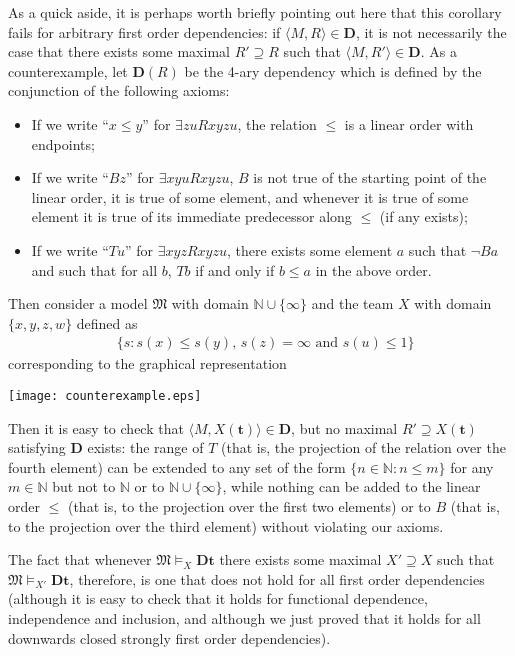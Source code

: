 \documentclass{article}
\theoremstyle{definition}
\newcommand{\tuple}{\mathbf}
\newcommand{\M}{\mathfrak M}
\newcommand{\D}{\mathbf D}
\begin{document}
As a quick aside, it is perhaps worth briefly pointing out here that this corollary fails for arbitrary first order dependencies: if $\langle M, R\rangle \in \D$, it is not necessarily the case that there exists some maximal $R' \supseteq R$ such that $\langle M, R'\rangle \in \D$. As a counterexample, let $\D(R)$ be the 4-ary dependency which is defined by the conjunction of the following axioms: 
\begin{itemize}
\item If we write ``$x \leq y$'' for $\exists z u R x y z u$, the relation $\leq$ is a linear order with endpoints; 
\item If we write ``$B z$'' for $\exists x y u R x y z u$, $B$ is not true of the starting point of the linear order, it is true of some element, and whenever it is true of some element it is true of its immediate predecessor along $\leq$ (if any exists); 
\item If we write ``$T u$'' for $\exists x y z R x y z u$, there exists some element $a$ such that $\lnot B a$ and such that for all $b$, $T b$ if and only if $b \leq a$ in the above order.
\end{itemize}
Then consider a model $\M$ with domain $\mathbb N \cup \{\infty\}$ and the team $X$  with domain $\{x,y,z,w\}$ defined as 
\begin{align*}
	&\{s :  s(x) \leq s(y) \text{, } s(z) = \infty \text{ and } s(u) \leq 1\}
\end{align*}
corresponding to the graphical representation
\begin{center}
\texttt{[image: counterexample.eps]}
\end{center}

Then it is easy to check that $\langle M, X(\tuple t)\rangle \in \D$, but no maximal $R' \supseteq X(\tuple t)$ satisfying $\D$ exists: the range of $T$ (that is, the projection of the relation over the fourth element) can be extended to any set of the form $\{n \in \mathbb N: n \leq m\}$ for any $m \in \mathbb N$ but not to $\mathbb N$ or to $\mathbb N \cup \{\infty\}$, while nothing can be added to the linear order $\leq$ (that is, to the projection over the first two elements) or to $B$ (that is, to the projection over the third element) without violating our axioms. 

The fact that whenever $\M \models_X \D \tuple t$ there exists some maximal $X' \supseteq X$ such that $\M \models_{X'} \D \tuple t$, therefore, is one that does not hold for all first order dependencies (although it is easy to check that it holds for functional dependence, independence and inclusion, and although we just proved that it holds for all downwards closed strongly first order dependencies).
\end{document}

